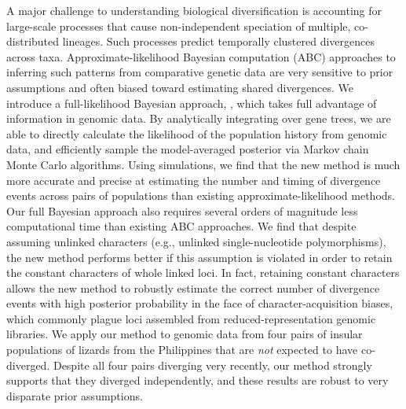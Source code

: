 A major challenge to understanding biological diversification is accounting for
large-scale processes that cause non-independent speciation of multiple,
co-distributed lineages.
Such processes predict temporally clustered divergences across taxa.
Approximate-likelihood Bayesian computation (ABC) approaches to inferring such
patterns from comparative genetic data are very sensitive to prior assumptions
and often biased toward estimating shared divergences.
We introduce a full-likelihood Bayesian approach, \ecoevolity, which takes full
advantage of information in genomic data.
By analytically integrating over gene trees, we are able to directly calculate
the likelihood of the population history from genomic data, and efficiently
sample the model-averaged posterior via Markov chain Monte Carlo algorithms.
Using simulations, we find that the new method is much more accurate and
precise at estimating the number and timing of divergence events across pairs
of populations than existing approximate-likelihood methods.
Our full Bayesian approach also requires several orders of magnitude less
computational time than existing ABC approaches.
We find that despite assuming unlinked characters (e.g., unlinked
single-nucleotide polymorphisms), the new method performs better if this
assumption is violated in order to retain the constant characters of whole
linked loci.
In fact, retaining constant characters allows the new method to robustly
estimate the correct number of divergence events with high posterior
probability in the face of character-acquisition biases, which commonly
plague loci assembled from reduced-representation genomic libraries.
We apply our method to genomic data from four pairs of insular populations of
 lizards from the Philippines that are \emph{not} expected to have
co-diverged.
Despite all four pairs diverging very recently, our method strongly supports
that they diverged independently, and these results are robust to very
disparate prior assumptions.
